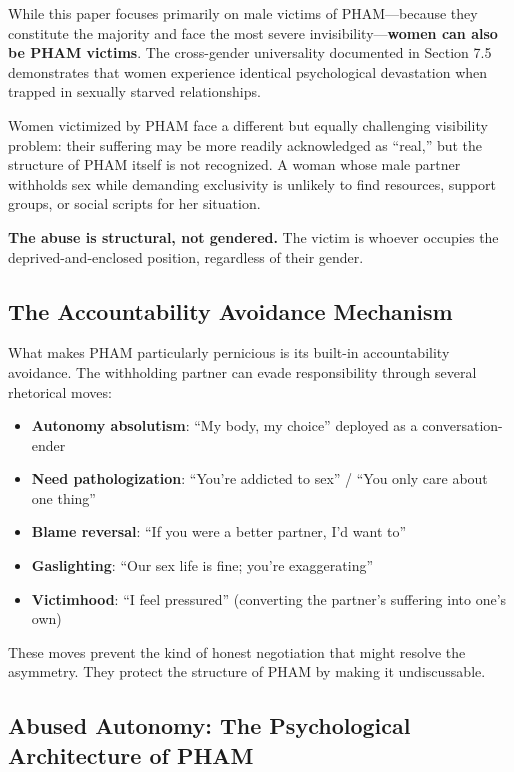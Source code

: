 \documentclass[12pt, letterpaper]{article}
\begin{document}
While this paper focuses primarily on male victims of PHAM---because they constitute the majority and face the most severe invisibility---\textbf{women can also be PHAM victims}. The cross-gender universality documented in Section 7.5 demonstrates that women experience identical psychological devastation when trapped in sexually starved relationships.

Women victimized by PHAM face a different but equally challenging visibility problem: their suffering may be more readily acknowledged as ``real,'' but the structure of PHAM itself is not recognized. A woman whose male partner withholds sex while demanding exclusivity is unlikely to find resources, support groups, or social scripts for her situation.

\textbf{The abuse is structural, not gendered.} The victim is whoever occupies the deprived-and-enclosed position, regardless of their gender.

\subsection{The Accountability Avoidance Mechanism}

What makes PHAM particularly pernicious is its built-in accountability avoidance. The withholding partner can evade responsibility through several rhetorical moves:

\begin{itemize}
    \item \textbf{Autonomy absolutism}: ``My body, my choice'' deployed as a conversation-ender
    \item \textbf{Need pathologization}: ``You're addicted to sex'' / ``You only care about one thing''
    \item \textbf{Blame reversal}: ``If you were a better partner, I'd want to''
    \item \textbf{Gaslighting}: ``Our sex life is fine; you're exaggerating''
    \item \textbf{Victimhood}: ``I feel pressured'' (converting the partner's suffering into one's own)
\end{itemize}

These moves prevent the kind of honest negotiation that might resolve the asymmetry. They protect the structure of PHAM by making it undiscussable.

\subsection{Abused Autonomy: The Psychological Architecture of PHAM}
\end{document}
